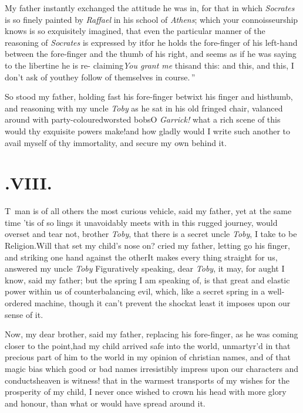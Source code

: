 \documentclass{article}
\begin{document}
My father instantly exchanged the attitude he was in, for that
in which \textit{So\-crates} is so finely painted by \textit{Raffael} in
his school of \textit{Athens}; which your connoisseurship knows is so
exquisitely imagined, that even the particular manner of the
reasoning of \textit{Socrates} is expressed by it\tsk for he holds
the fore-finger of his left-hand between the fore-finger and the
thumb of his right, and seems as if he
was saying to the libertine he is re-\break
claiming\tsk \lqq\textit{You grant me} this\tsk and this:\break
\lqq and this, and this, I don’t ask of\break
\lqq you\tsk they follow of themselves in\break
\lqq course.\,”

So stood my father, holding fast his fore-finger betwixt his
finger and his\break thumb, and reasoning with my
uncle\break
\textit{Toby} as he sat in his old fringed chair, valanced
around with party-coloured\break worsted bobs\tsk O
\textit{Garrick!} what a rich scene of this would thy
exquisite powers make!\@ and how gladly would I write such
another to avail myself of thy immortality, and secure my
own behind it.

\parskip
{}
\newpage
\null\smallskip
\section{.\enspace VIII.}

\lettrine{T}{\,} man is of all others\break
the most curious vehicle, said my\break
father, yet at the same time ’tis of so 
\break 
lings it unavoidably meets with in this rugged journey,
would overset and tear  not, brother \textit{Toby}, that there is a secret
 uncle
\textit{Toby}, I take to be Religion.\tsk Will that set my
child’s nose on?  cried my father, letting go his finger,
and striking one hand against the other\tsk It makes every
thing straight for us, answered my uncle \textit{Toby}\tsk
Figuratively speaking, dear \textit{Toby}, it may, for aught
I know, said my father; but the spring I am speaking of, is
that great and elastic power within us of counterbalancing
evil, which, like a secret spring in a well-ordered machine,
though it can’t prevent the shock\tsh at least it imposes
upon our sense of it.

Now, my dear brother, said my father, replacing his
fore-finger, as he was coming closer to the point,\tsk had my
child arrived safe into the world, unmartyr’d in that
precious part of him\tsk
{} 
to the world in my opinion of christian names, and of
that magic bias which good or bad names irresistibly impress
upon our characters and conducts\tsk heaven is witness! that
in the warmest transports of my wishes for the prosperity of
my child, I never once wished to crown his head with more
glory and honour, than what  or
 would have spread around it.
\end{document}
